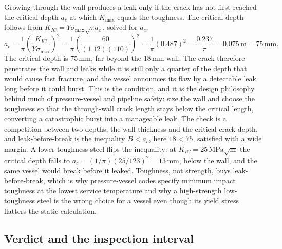 Growing through the wall produces a leak only if the crack has not first
reached the critical depth $a_c$ at which $K_{\max}$ equals the
toughness. The critical depth follows from $K_{IC} = Y\sigma_{\max}\sqrt{
\pi a_c}$, solved for $a_c$,
\[
a_c = \frac{1}{\pi}\left(\frac{K_{IC}}{Y\sigma_{\max}}\right)^2 =
\frac{1}{\pi}\left(\frac{60}{(1.12)(110)}\right)^2 = \frac{1}{\pi}(0.487)^2
= \frac{0.237}{\pi} = 0.075\,\text{m} = 75\,\si{\milli\meter}.
\]
The critical depth is $75\,\si{\milli\meter}$, far beyond the
$18\,\si{\milli\meter}$ wall. The crack therefore penetrates the wall and
leaks while it is still only a quarter of the depth that would cause fast
fracture, and the vessel announces its flaw by a detectable leak long
before it could burst. This is the  condition,
and it is the design philosophy behind much of pressure-vessel and
pipeline safety: size the wall and choose the toughness so that the
through-wall crack length stays below the critical length, converting a
catastrophic burst into a manageable leak. The check is a competition
between two depths, the wall thickness and the critical crack depth, and
leak-before-break is the inequality $B < a_c$, here $18 < 75$, satisfied
with a wide margin. A lower-toughness steel flips the inequality: at
$K_{IC} = 25\,\text{MPa}\sqrt{\text{m}}$ the critical depth falls to
$a_c = (1/\pi)(25/123)^2 = 13\,\si{\milli\meter}$, below the wall, and
the same vessel would break before it leaked. Toughness, not strength,
buys leak-before-break, which is why pressure-vessel codes specify
minimum impact toughness at the lowest service temperature and why a
high-strength low-toughness steel is the wrong choice for a vessel even
though its yield stress flatters the static calculation.

\subsection{Verdict and the inspection interval}

